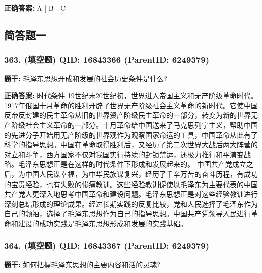\documentclass[12pt,UTF8]{ctexart}
\begin{document}
\textbf{正确答案:}
A | B | C

\vspace{0.3em}\hrulefill\vspace{0.7em}

\subsection*{简答题一}

\subsubsection*{363. (填空题) \small QID: 16843366 (ParentID: 6249379)}

\textbf{题干:}
毛泽东思想开成和发展的社会历史条件是什么?



\textbf{正确答案:}
时代条件
19世纪末20世纪初，世界进入帝国主义和无产阶级革命时代。1917年俄国十月革命的胜利开辟了世界无产阶级社会主义革命的新时代。它使中国反帝反封建的民主革命从旧的世界资产阶级民主革命的一部分，转变为新的世界无产阶级社会主义革命的一部分。十月革命给中国送来了马克思列宁主义，帮助中国的先进分子开始用无产阶级的世界观作为观察国家命运的工具，中国革命从此有了科学的指导思想。中国在革命取得胜利后，又经历了第二次世界大战后两大阵营的对立和斗争，西方国家不仅对我国实行持续的封锁禁运，还极力推行和平演变战略。毛泽东思想正是在这样的时代条件下形成和发展起来的。
中国共产党成立之后，为中国人民谋幸福，为中华民族谋复兴，经历了千辛万苦的奋斗历程，有成功的宝贵经验，也有失败的惨痛教训。这些经验教训促使以毛泽东为主要代表的中国共产党人更深入地思考中国革命和建设问题。毛泽东思想正是对这些经验教训进行深刻总结形成的理论成果。经过长期实践的反复比较，党和人民选择了毛泽东作为自己的领袖，选择了毛泽东思想作为自己的指导思想。中国共产党领导人民进行革命和建设的成功实践是毛泽东思想形成和发展的实践基础。

\vspace{0.3em}\hrulefill\vspace{0.7em}

\subsubsection*{364. (填空题) \small QID: 16843367 (ParentID: 6249379)}

\textbf{题干:}
如何把握毛泽东思想的主要内容和活的灵魂?
\end{document}
